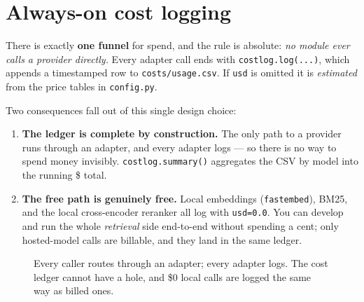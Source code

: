 \documentclass[11pt]{article}
\newcommand{\code}[1]{\texttt{#1}}
\begin{document}
\FloatBarrier
\section{Always-on cost logging}\label{sec:cost}

There is exactly \textbf{one funnel} for spend, and the rule is absolute: \emph{no module ever calls a
provider directly.} Every adapter call ends with \code{costlog.log(...)}, which appends a timestamped
row to \code{costs/usage.csv}. If \code{usd} is omitted it is \emph{estimated} from the price tables in
\code{config.py}.

Two consequences fall out of this single design choice:

\begin{enumerate}[leftmargin=1.6em, itemsep=2pt]
  \item \textbf{The ledger is complete by construction.} The only path to a provider runs through an
        adapter, and every adapter logs --- so there is no way to spend money invisibly.
        \code{costlog.summary()} aggregates the CSV by model into the running \$ total.
  \item \textbf{The free path is genuinely free.} Local embeddings (\code{fastembed}), BM25, and the
        local cross-encoder reranker all log with \code{usd=0.0}. You can develop and run the whole
        \emph{retrieval} side end-to-end without spending a cent; only hosted-model calls are billable,
        and they land in the same ledger.
\end{enumerate}

\begin{figure}[h]
\centering
{}
\caption{Every caller routes through an adapter; every adapter logs. The cost ledger cannot have a
hole, and \$0 local calls are logged the same way as billed ones.}
\end{figure}
\end{document}
